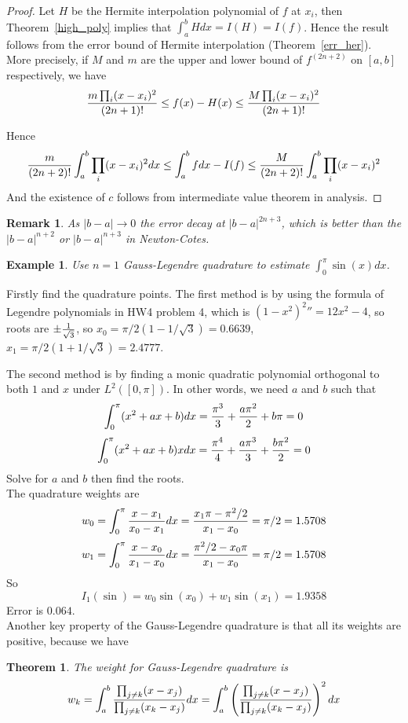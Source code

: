 \documentclass{article} %
\theoremstyle{break}
\newtheorem{exa}[definition]{Example}
\newtheorem{thm}[definition]{Theorem}
\newtheorem{rem}[definition]{Remark}
\begin{document}
  \begin{proof}
    Let $H$ be the Hermite interpolation polynomial of $f$ at $x_i$, then Theorem~\ref{high_poly} implies that $\int_a^bHdx=I(H)=I(f)$. Hence the result follows from the error bound of Hermite interpolation (Theorem~\ref{err_her}).\\


  More precisely, if $M$ and $m$ are the upper and lower bound of $f^{(2n+2)}$ on $[a, b]$ respectively, we have
    \[{m\prod_i(x-x_i)^2\over(2n+1)!}\leq f(x)-H(x)\leq {M\prod_i(x-x_i)^2\over(2n+1)!}\]

  Hence
    \[{m\over (2n+2)!}\int_a^b\prod_i(x-x_i)^2 dx\leq \int_a^bfdx-I(f)\leq {M\over (2n+2)!}\int_a^b\prod_i(x-x_i)^2\]
    And the existence of $c$ follows from intermediate value theorem in analysis.
  \end{proof}

  
  \begin{rem}
As $|b-a|\rightarrow 0$ the error decay at $|b-a|^{2n+3}$, which is better than the $|b-a|^{n+2}$ or $|b-a|^{n+3}$ in Newton-Cotes.
    \end{rem}
  

    \begin{exa} Use $n=1$ Gauss-Legendre quadrature to estimate $\int_0^\pi \sin(x)dx$.
    \end{exa}

    Firstly find the quadrature points. The first method is by using the formula of Legendre polynomials in HW4 problem 4, which is ${(1-x^2)^2}''=12x^2-4$, so roots are $\pm{1\over\sqrt{3}}$, so $x_0={\pi/2}(1-1/\sqrt{3})=0.6639$, $x_1={\pi/2}(1+1/\sqrt{3})=2.4777$.

    The second method is by finding a monic quadratic polynomial orthogonal to both $1$ and $x$ under $L^2([0, \pi])$. In other words, we need $a$ and $b$ such that
\[\int_0^\pi (x^2+ax+b)dx={\pi^3\over 3}+{a\pi^2\over 2}+b\pi=0\]
\[\int_0^\pi (x^2+ax+b)xdx={\pi^4\over 4}+{a\pi^3\over 3}+{b\pi^2\over 2}=0\]
Solve for $a$ and $b$ then find the roots.\\


    The quadrature weights are 
\[w_0=\int_0^\pi{x-x_1\over x_0-x_1}dx={x_1\pi-\pi^2/2\over x_1-x_0}=\pi/2=1.5708\]
\[w_1=\int_0^\pi{x-x_0\over x_1-x_0}dx={\pi^2/2-x_0\pi\over x_1-x_0}=\pi/2=1.5708\]
    So 
    \[I_1(\sin)=w_0\sin(x_0)+w_1\sin(x_1)=1.9358\]
    Error is $0.064$.\\

Another key property of the Gauss-Legendre quadrature is that all its weights are positive, because we have
\begin{thm}\label{pos_wt}
  The weight for Gauss-Legendre quadrature is
  \[w_k=\int_a^b{\prod_{j\not=k}(x-x_j)\over \prod_{j\not=k}(x_k-x_j)}dx=\int_a^b\left({\prod_{j\not=k}(x-x_j)\over \prod_{j\not=k}(x_k-x_j)}\right)^2dx\]
\end{thm}
\end{document}
